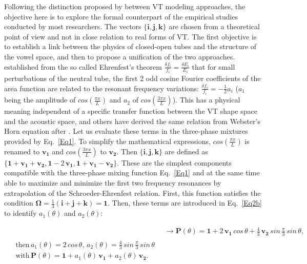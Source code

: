 \documentclass[10pt,twocolumn]{article}
\newcommand{\linenomath}{}                 %
\let\cite\citep                             %
\begin{document}
Following the distinction proposed by \cite{StoryTitze1998} between VT modeling approaches, the objective here is to explore the formal counterpart of the empirical studies conducted by most researchers. The vectors $\{\bm{i},\bm{j}, \bm{k}\}$ are chosen from a theoretical point of view and not in close relation to real forms of VT. The first objective is to establish a link between the physics of closed-open tubes and the structure of the vowel space, and then to propose a unification of the two approaches. \cite{Schroeder1967} established from the so called Ehrenfest's theorem $\tfrac {\delta f_i}{f_i} = \tfrac{\delta E_i}{E_i}$ that for small perturbations of the neutral tube, the first 2 odd cosine Fourier coefficients of the area function are related to the resonant frequency variations: $\tfrac {\delta f_i}{f_i} = -\tfrac {1}{2} a_i$ ($a_1$ being the amplitude of $cos(\tfrac {\pi x}{L})$ and $a_2$ of $cos(\tfrac {3 \pi x}{L})$). This has a physical meaning independent of a specific transfer function between the VT shape space and the acoustic space, and others \cite{Mermelstein1967,Heinz1967} have derived the same relation from Webster's Horn equation after \cite{Ungeheuer62}. Let us evaluate these terms in the three-phase mixtures provided by Eq.~\ref{Eq1}. To simplify the mathematical expressions, $cos(\tfrac {\pi x}{L})$ is renamed to $\bm{v_1}$ and $cos(\tfrac {3 \pi x}{L})$ to $\bm{v_2}$. Then $\{\bm{i},\bm{j}, \bm{k}\}$ are defined as $\{\bm{1}+\bm{v_1}+\bm{v_2},\bm{1}-2\,\bm{v_1}, \bm{1}+\bm{v_1}-\bm{v_2}\}$. These are the simplest components compatible with the three-phase mixing function Eq.~\ref{Eq1} and at the same time able to maximize and minimize the first two frequency resonances by extrapolation of the Schroeder-Ehrenfest relation. First, this function satisfies the condition $\bm{\Omega}=\tfrac{1}{3}(\bm{i}+\bm{j}+\bm{k})=\bm{1}$. Then, these terms are introduced in Eq.~\ref{Eq2b} to identify $a_1(\theta)$ and $a_2(\theta)$:
\linenomath
\begin{subequations}
\begin{align}
&\rightarrow \bm{P}(\theta) = \bm{1} + 2\, \bm{v_1} \,cos\,\theta + \frac {4}{3} \, \bm{v_2}  \,sin\,\frac{\pi}{3} \,sin\,\theta,  \label{Eq3a} \\
\begin{split}
&\text{then} \, a_1(\theta)=2\,cos\,\theta, \, a_2(\theta)=\frac {4}{3} \,sin\,\frac{\pi}{3} \,sin\,\theta \, \\
&\text{with} \, \bm{P}(\theta) = \bm{1} + a_1(\theta) \, \bm{v_1} + a_2(\theta) \, \bm{v_2}.\label{Eq3b}
\end{split}
\end{align}
\end{subequations}
\end{document}
